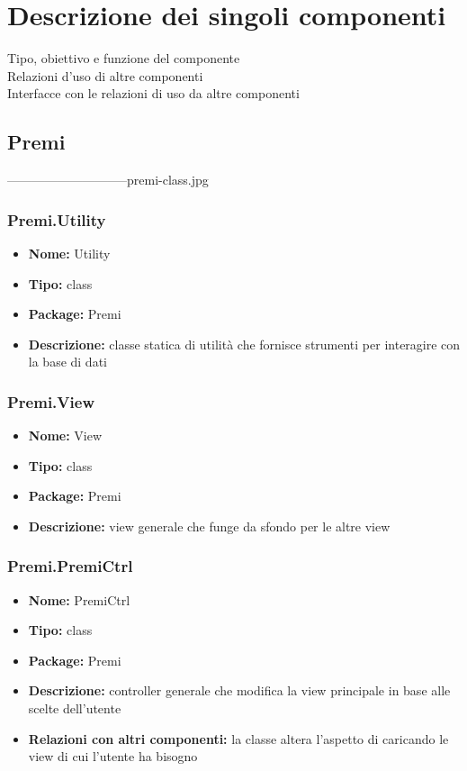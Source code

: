 \section{Descrizione dei singoli componenti}
	Tipo, obiettivo e funzione del componente \\
	Relazioni d'uso di altre componenti \\
	Interfacce con le relazioni di uso da altre componenti \\
\subsection{Premi}
-----------------------------premi-class.jpg


\subsubsection{Premi.Utility}
\begin{itemize}
  \item[] \textbf{Nome:} Utility
  \item[] \textbf{Tipo:} class
  \item[] \textbf{Package:} Premi
  \item[] \textbf{Descrizione:} classe statica di utilità che fornisce strumenti per interagire con la base di dati
\end{itemize}

\subsubsection{Premi.View}
\begin{itemize}
  \item \textbf{Nome:} View
  \item \textbf{Tipo:} class
  \item \textbf{Package:} Premi
  \item \textbf{Descrizione:} view generale che funge da sfondo per le altre view
\end{itemize}

\subsubsection{Premi.PremiCtrl}
\begin{itemize}
  \item \textbf{Nome:} PremiCtrl
  \item \textbf{Tipo:} class
  \item \textbf{Package:} Premi
  \item \textbf{Descrizione:} controller generale che modifica la view principale in base alle scelte dell'utente
  \item \textbf{Relazioni con altri componenti:} la classe altera l'aspetto di  caricando le view di cui l'utente ha bisogno 
\end{itemize}

